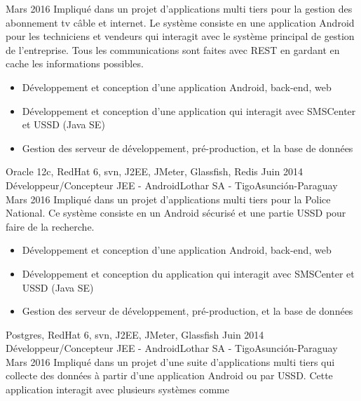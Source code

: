 \begin{experiences}
    {Mars 2016}
                 {Impliqué dans un projet d'applications multi tiers pour la gestion des abonnement tv câble et internet.
                 Le système consiste en une application Android pour les techniciens et vendeurs qui interagit avec le système
                 principal de gestion de l'entreprise. Tous les communications sont faites avec REST en gardant en cache les
                 informations possibles.
                }
                 {
                      \begin{itemize}
                        \item Développement et conception d'une application Android, back-end, web
                        \item Développement et conception d’une application qui interagit avec SMSCenter et USSD (Java SE)
                        \item Gestion des serveur de développement, pré-production, et la base de données
                      \end{itemize}
                 }
                 {Oracle 12c, RedHat 6, svn, J2EE, JMeter, Glassfish, Redis}
  \emptySeparator
  \projectexperiences
    {Juin 2014}  {Développeur/Concepteur JEE - Android}{Lothar SA - Tigo}{Asunción-Paraguay}
    {Mars 2016}
                 {Impliqué dans un projet d'applications multi tiers pour la Police National. Ce système
                 consiste en un Android sécurisé et une partie USSD pour faire de la recherche.
                }
                 {
                      \begin{itemize}
                        \item Développement et conception d'une application Android, back-end, web
                        \item Développement et conception du application qui interagit avec SMSCenter et USSD (Java SE)
                        \item Gestion des serveur de développement, pré-production, et la base de données
                      \end{itemize}
                 }
                 {Postgres, RedHat 6, svn, J2EE, JMeter, Glassfish}
  \emptySeparator
  \projectexperiences
    {Juin 2014}  {Développeur/Concepteur JEE - Android}{Lothar SA - Tigo}{Asunción-Paraguay}
    {Mars 2016}
                 {Impliqué dans un projet d'une suite d'applications multi tiers qui collecte des données à partir
                 d'une application Android ou par USSD. Cette application interagit avec plusieurs systèmes comme
}
\end{experiences}
